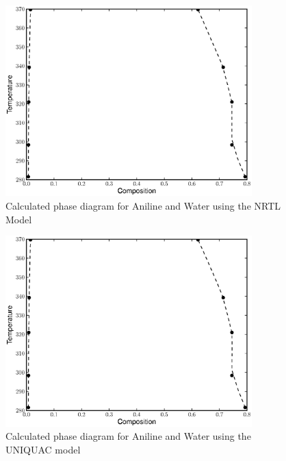 \begin{figure}[hp]
\centering
\includegraphics[width = 0.85\textwidth]{Results_Parts/BinaryParams/aniline-water/NRTL/PhaseDiagram.eps}
\caption{Calculated phase diagram for Aniline and Water using the NRTL Model} \label{NRTLaniline-water}
\end{figure}	

\begin{figure}[hp]
\centering
\includegraphics[width = 0.85\textwidth]{Results_Parts/BinaryParams/aniline-water/UNIQUAC/PhaseDiagram.eps}
\caption{Calculated phase diagram for Aniline and Water using the UNIQUAC model} \label{UNIQUACaniline-water}
\end{figure}	

\clearpage


